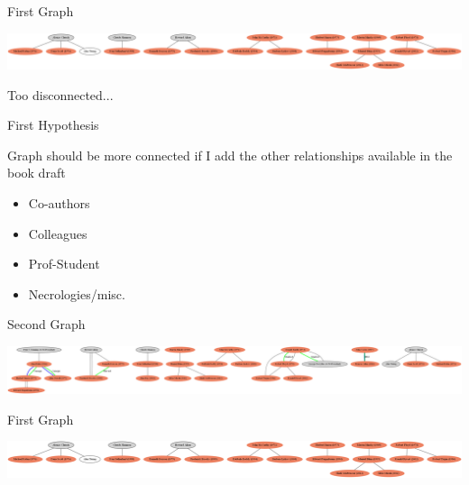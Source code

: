 \documentclass[11pt,aspectratio=169]{beamer}
\begin{document}
\begin{frame}{First Graph}
    \begin{center}
        \includegraphics[scale = 0.14]{dotrel1.png}
        \pause
    \end{center}
    \begin{center}
        \vspace{1.0cm}
        Too disconnected...
    \end{center}
\end{frame}

\begin{frame}{First Hypothesis}
    \pause
    \begin{center}
        Graph should be more connected if I add the other relationships available in the book draft
        \pause

        \vspace{1.0cm}
        \begin{itemize}
            \item Co-authors
            \item Colleagues
            \item Prof-Student
            \item Necrologies/misc.
        \end{itemize}
    \end{center}
\end{frame}

\begin{frame}{Second Graph}
    \begin{center}
        \includegraphics[scale = 0.12]{dotrel3.png}
    \end{center}
\end{frame}

\begin{frame}{First Graph}
    \begin{center}
        \includegraphics[scale = 0.14]{dotrel1.png}
    \end{center}
\end{frame}
\end{document}
